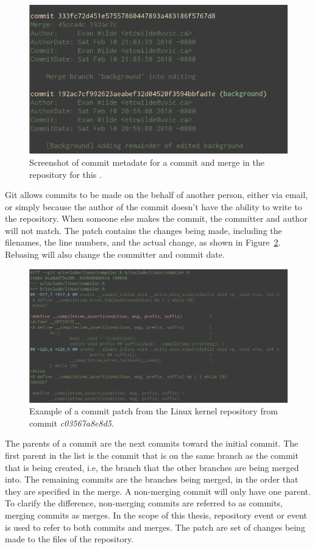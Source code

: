 \begin{figure}[htpb]
  \centering
  \includegraphics[width=0.8\linewidth]{Figures/background/commit_metadata.png}
  \caption{Screenshot of commit metadate for a commit and merge in the
    repository for this \paper{}.}
  \label{fig:commit_metadata}
\end{figure}

Git allows commits to be made on the behalf of another person, either
via email, or simply because the author of the commit doesn't have the
ability to write to the repository.
When someone else makes the commit, the committer and author will not
match. The patch contains the changes being made, including the
filenames, the line numbers, and the actual change, as shown in
Figure~\ref{fig:commit_patch}.
Rebasing will also change the committer and commit date.

\begin{figure}[htpb]
  \centering
  \includegraphics[width=0.8\linewidth]{Figures/background/commit_patch.png}
  \caption{Example of a commit patch from the Linux kernel repository
    from commit \textit{c03567a8e8d5}.}
  \label{fig:commit_patch}
\end{figure}

The parents of a commit are the next commits toward the initial commit.
The first parent in the list is the commit that is on the same branch
as the commit that is being created, i.e, the branch that the other
branches are being merged into.
The remaining commits are the branches being merged, in the order that
they are specified in the merge.
A non-merging commit will only have one parent.
To clarify the difference, non-merging commits are referred to as
commits, merging commits as merges.
In the scope of this thesis, repository event or event is used to refer
to both commits and merges.
The patch are set of changes being made to the files of the repository.

